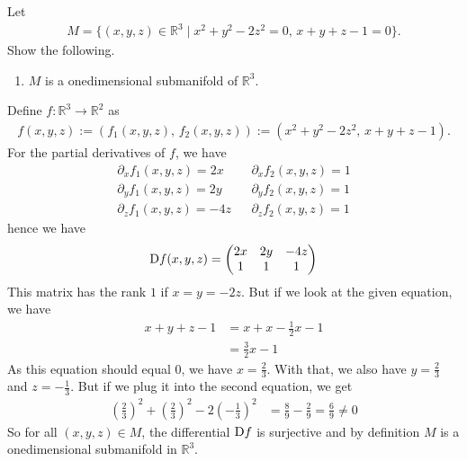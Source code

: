 \begin{question}
    Let
    \begin{align}
        M = \{ (x, y, z) \in \mathbb{R}^3 \mid x^2 + y^2 - 2z^2 = 0, \, x + y + z - 1 = 0\} \text{.}
    \end{align}
    Show the following.
    \begin{enumerate}
        \item \(M\) is a onedimensional submanifold of \(\mathbb{R}^3\).
    \end{enumerate}
\end{question}
\begin{solution}
    Define \(f: \mathbb{R}^3 \rightarrow \mathbb{R}^2\) as
    \begin{align}
        f(x, y, z) := (f_1(x, y, z), \, f_2(x, y, z)):= (x^2 + y^2 - 2z^2, \, x + y + z - 1) \text{.}
    \end{align}
    For the partial derivatives of \(f\), we have
    \begin{align}
        \partial_x f_1(x, y , z) = 2x && \partial_x f_2(x, y, z) = 1 \\
        \partial_y f_1(x, y, z) = 2y && \partial_y f_2(x, y, z) = 1 \\
        \partial_z f_1(x, y, z) = -4z && \partial_z f_2(x, y, z) = 1
    \end{align}
    hence we have
    \begin{align}
        \mathop{}\!\mathrm{D} f (x, y, z) = \begin{pmatrix}
            2x & 2y & -4z \\
            1 & 1 & 1
        \end{pmatrix}
    \end{align}
    This matrix has the rank \(1\) if \(x = y = -2z\). But if we look at the given equation, we have
    \begin{align}
        x + y + z - 1 &= x + x - \frac{1}{2}x - 1 \\
        &= \frac{3}{2} x - 1
    \end{align}
    As this equation should equal \(0\), we have \(x = \frac{2}{3}\). With that, we also have \(y = \frac{2}{3}\) and \(z = -\frac{1}{3}\). But if we plug it into the second equation, we get
    \begin{align}
        (\frac{2}{3})^2 + (\frac{2}{3})^2 - 2 (-\frac{1}{3})^2 &= \frac{8}{9} - \frac{2}{9} = \frac{6}{9} \neq 0
    \end{align}
    So for all \((x, y, z) \in M\), the differential \(\mathop{}\!\mathrm{D} f\) is surjective and by definition \(M\) is a onedimensional submanifold in \(\mathbb{R}^3\).
\end{solution}